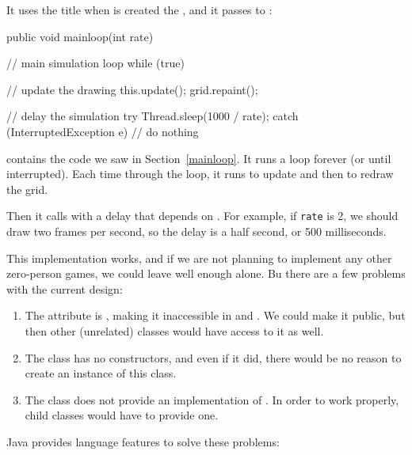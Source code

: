 It uses the title when is created the , and it passes  to :

\begin{code}
    public void mainloop(int rate) {
        // main simulation loop
        while (true) {

            // update the drawing
            this.update();
            grid.repaint();

            // delay the simulation
            try {
                Thread.sleep(1000 / rate);
            } catch (InterruptedException e) {
                // do nothing
            }
        }
    }
\end{code}

 contains the code we saw in Section~\ref{mainloop}.
It runs a  loop forever (or until interrupted).  
Each time through the loop, it runs  to update  and then  to redraw the grid.

Then it calls  with a delay that depends on .
For example, if {\tt rate} is 2, we should draw two frames per second, so the delay is a half second, or 500 milliseconds.

This implementation works, and if we are not planning to implement any other zero-person games, we could leave well enough alone.
Bu there are a few problems with the current design:

\begin{enumerate}

\item The  attribute is , making it inaccessible in  and .
We could make it public, but then other (unrelated) classes would have access to it as well.

\item The  class has no constructors, and even if it did, there would be no reason to create an instance of this class.

\item The  class does not provide an implementation of .
In order to work properly, child classes would have to provide one.

\end{enumerate}


Java provides language features to solve these problems:

